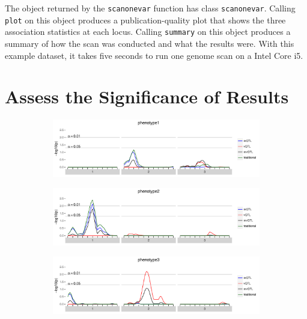 \documentclass{article}
\begin{document}
The object returned by the \texttt{scanonevar} function has class \texttt{scanonevar}.
Calling \texttt{plot} on this object produces a publication-quality plot that shows the three association statistics at each locus.
Calling \texttt{summary} on this object produces a summary of how the scan was conducted and what the results were.
With this example dataset, it takes five seconds to run one genome scan on a Intel Core i5.




\section*{Assess the Significance of Results}

\begin{figure}[t]
    \begin{subfigure}[b]{0.9\textwidth}
        \includegraphics[width=\textwidth]{images/empir_p_scan_phenotype1.pdf}
    \end{subfigure}

    \begin{subfigure}[b]{0.9\textwidth}
        \includegraphics[width=\textwidth]{images/empir_p_scan_phenotype2.pdf}
    \end{subfigure}

    \begin{subfigure}[b]{0.9\textwidth}
        \includegraphics[width=\textwidth]{images/empir_p_scan_phenotype3.pdf}
    \end{subfigure}


\end{figure}
\end{document}
